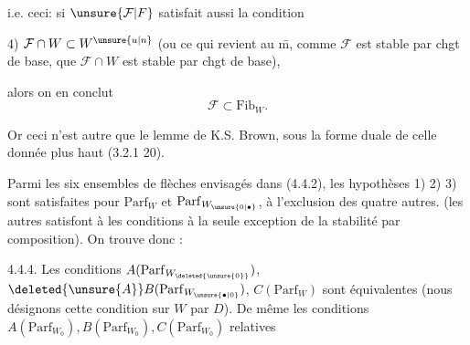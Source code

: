 
i.e. ceci: si $\unsure{\mathcal{F}|F}$ satisfait aussi la condition

4) $\mathcal{F}\cap W\subset W^{\unsure{u|n}}$ (ou ce qui revient au \={m}, comme $\mathcal{F}$  est stable par chgt de base, que $\mathcal{F}\cap W$ est stable par chgt de base),

alors on en conclut
\[
 \mathcal{F}\subset\mathrm{Fib}_{W}.
\]

Or ceci n'est autre que le lemme de K.S. Brown, sous la forme duale de celle donnée plus haut (3.2.1\unsure{;|,}  20).

Parmi les six ensembles de flèches envisagés dans (4.4.2), les hypothèses 1) 2) 3) sont satisfaites pour $\mathrm{Parf}_{W}$ et $\mathrm{Parf}_{W_{\unsure{0|\bullet}}}$, à l'exclusion des quatre autres.   (les autres satisfont à  les conditions\unsure{;|,} à la seule exception de la stabilité par composition). On trouve donc :


 4.4.4. Les conditions $A(\mathrm{Parf}_{W_{\deleted{\unsure{0}}}})$, $\deleted{\unsure{A}}B(\mathrm{Parf}_{W_{\unsure{\bullet|0}}})$, $C(\mathrm{Parf}_{W})$ sont équivalentes (nous désignons cette condition sur $W$ par $D$). De même les conditions $A(\mathrm{Parf}_{W_0}),B(\mathrm{Parf}_{W_0}),C(\mathrm{Parf}_{W_0})$  relatives
